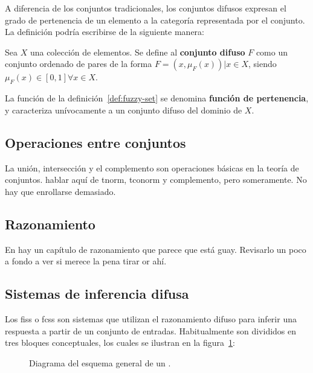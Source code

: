 A diferencia de los conjuntos tradicionales, los conjuntos difusos expresan el grado de pertenencia de un elemento a la categoría representada por el conjunto. La definición podría escribirse de la siguiente manera:


\begin{definition}
	Sea $X$ una colección de elementos. Se define al \textbf{conjunto difuso} $F$ como un conjunto ordenado de pares de la forma $F = {(x, \mu_F(x)) | x \in X}$, siendo $\mu_F(x) \in [0, 1] \forall x \in X$.
	\label{def:fuzzy-set}
\end{definition}

La función de la definición~\ref{def:fuzzy-set} se denomina \textbf{función de pertenencia}, y caracteriza unívocamente a un conjunto difuso del dominio de $X$.


\subsection{Operaciones entre conjuntos}

La unión, intersección y el complemento son operaciones básicas en la teoría de conjuntos. \TODO hablar aquí de tnorm, tconorm y complemento, pero someramente. No hay que enrollarse demasiado.

\subsection{Razonamiento}

En \cite{Ma2004} hay un capítulo de razonamiento que parece que está guay. Revisarlo un poco a fondo a ver si merece la pena tirar or ahí.

\subsection{Sistemas de inferencia difusa}

Los \acp{fis} o \acp{fcs} son sistemas que utilizan el razonamiento difuso para inferir una respuesta a partir de un conjunto de entradas. Habitualmente son divididos en tres bloques conceptuales, los cuales se ilustran en la figura~\ref{fig:fis-general-schema}:


\begin{figure}
	\caption{Diagrama del esquema general de un .}
	\label{fig:fis-general-schema}
\end{figure}


